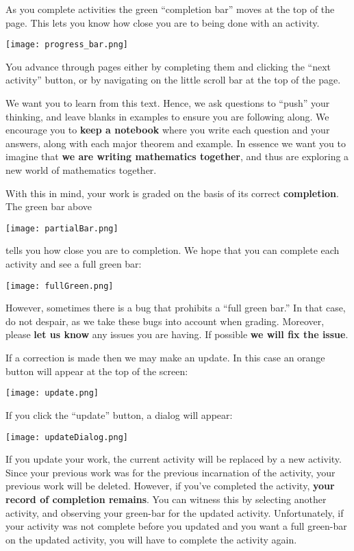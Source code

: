 \documentclass{ximera}
\begin{document}
As you complete activities the green ``completion bar'' moves at the
top of the page.  This lets you know how close you are to being done
with an activity.

\begin{center}
  \texttt{[image: progress\_bar.png]}
\end{center}
 
You advance through pages either by completing them and clicking the
``next activity'' button, or by navigating on the little scroll bar at
the top of the page.

We want you to learn from this text. Hence, we ask questions to
``push'' your thinking, and leave blanks in examples to ensure you are
following along. We encourage you to \textbf{keep a notebook} where
you write each question and your answers, along with each major
theorem and example. In essence we want you to imagine that \textbf{we
  are writing mathematics together}, and thus are exploring a new
world of mathematics together.
 
With this in mind, your work is graded on the basis of its correct
\textbf{completion}. The green bar above
\begin{image}
  \texttt{[image: partialBar.png]}
\end{image} 
tells you how close you are to completion. We hope that you can
complete each activity and see a full green bar:
\begin{image}
  \texttt{[image: fullGreen.png]}
\end{image}
However, sometimes there is a bug that prohibits a ``full green bar.''
In that case, do not despair, as we take these bugs into account when
grading. Moreover, please \textbf{let us know} any issues you are
having. If possible \textbf{we will fix the issue}.
 
If a correction is made then we may make an update. In this case an orange button will appear at the top of the screen:
\begin{image}
  \texttt{[image: update.png]}
\end{image}
If you click the ``update'' button, a dialog will appear:
\begin{image}
  \texttt{[image: updateDialog.png]}
\end{image}
If you update your work, the current activity will be replaced by a
new activity. Since your previous work was for the previous
incarnation of the activity, your previous work will be
deleted. However, if you've completed the activity, \textbf{your
  record of completion remains}. You can witness this by selecting
another activity, and observing your green-bar for the updated
activity.  Unfortunately, if your activity was not complete before you
updated and you want a full green-bar on the updated activity, you
will have to complete the activity again.
 
\end{document}
